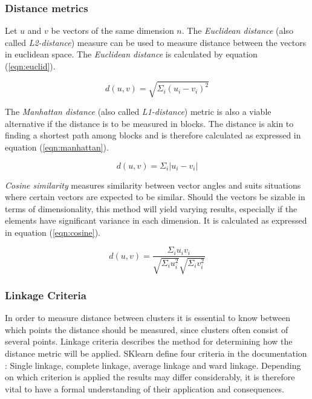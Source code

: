 \subsubsection{Distance metrics}
Let $u$ and $v$ be vectors of the same dimension $n$. The \textit{Euclidean distance} (also called \textit{L2-distance}) measure can be used to measure distance between the vectors in euclidean space. The \textit{Euclidean distance} is calculated by equation (\ref{eqn:euclid}).

\begin{equation}
\label{eqn:euclid}
d(u, v) = \sqrt{\Sigma_i (u_i - v_i)^2} 
\end{equation}

The \textit{Manhattan distance} (also called \textit{L1-distance}) metric is also a viable alternative if the distance is to be measured in blocks. The distance is akin to finding a shortest path among blocks and is therefore calculated as expressed in equation (\ref{eqn:manhattan}).

\begin{equation}
\label{eqn:manhattan}
d(u, v) = \Sigma_i |u_i - v_i|
\end{equation}

\textit{Cosine similarity} measures similarity between vector angles and suits situations where certain vectors are expected to be similar. Should the vectors be sizable in terms of dimensionality, this method will yield varying results, especially if the elements have significant variance in each dimension. It is calculated as expressed in equation (\ref{eqn:cosine}).

\begin{equation}
\label{eqn:cosine}
d(u, v) = \frac{\Sigma_i u_iv_i}{\sqrt{\Sigma_i u_i^2}\sqrt{\Sigma_i v_i^2}}
\end{equation}

\subsubsection{Linkage Criteria}
In order to measure distance between clusters it is essential to know between which points the distance should be measured, since clusters often consist of several points. Linkage criteria describes the method for determining how the distance metric will be applied. SKlearn define four criteria in the documentation \cite{scikit}: Single linkage, complete linkage, average linkage and ward linkage. Depending on which criterion is applied the results may differ considerably, it is therefore vital to have a formal understanding of their application and consequences.

